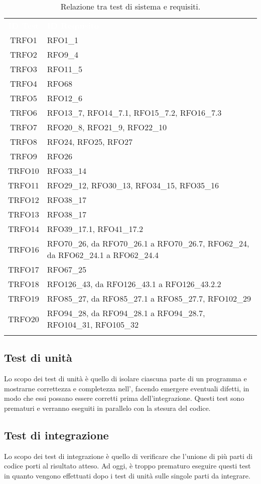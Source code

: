 \begin{longtable}{|c| C{13cm}|}
	\textcolor{white}{\textbf{ID Test}}&
	\textcolor{white}{\textbf{ID Requisito}}\label{tab:TestSistema2}\\
	TRFO1 & RFO1\_1\\ \hline
	TRFO2 & RFO9\_4\\ \hline
	TRFO3 & RFO11\_5\\ \hline
	TRFO4 & RFO68\\ \hline
	TRFO5 & RFO12\_6\\\hline
	TRFO6 & RFO13\_7, RFO14\_7.1, RFO15\_7.2, RFO16\_7.3\\ \hline
	TRFO7 & RFO20\_8, RFO21\_9, RFO22\_10\\ \hline
	TRFO8 & RFO24, RFO25, RFO27\\ \hline
	TRFO9 & RFO26\\ \hline
	TRFO10 & RFO33\_14\\ \hline
	TRFO11 & RFO29\_12, RFO30\_13, RFO34\_15, RFO35\_16\\ \hline
	TRFO12 & RFO38\_17\\ \hline
	TRFO13 & RFO38\_17\\ \hline
	TRFO14 & RFO39\_17.1, RFO41\_17.2\\ \hline
	TRFO16 & RFO70\_26, da RFO70\_26.1 a RFO70\_26.7, RFO62\_24, da RFO62\_24.1 a RFO62\_24.4   \\ \hline
	TRFO17 & RFO67\_25\\ \hline
	TRFO18 & RFO126\_43, da RFO126\_43.1 a RFO126\_43.2.2\\ \hline
	TRFO19 & RFO85\_27, da RFO85\_27.1 a RFO85\_27.7, RFO102\_29\\ \hline
	TRFO20 & RFO94\_28, da RFO94\_28.1 a RFO94\_28.7, RFO104\_31, RFO105\_32\\ \hline
	\caption{Relazione tra test di sistema e requisiti.}\\
\end{longtable}
\newpage
\subsection{Test di unità}
Lo scopo dei test di unità è quello di isolare ciascuna parte di un programma e mostrarne correttezza e completezza nell', facendo emergere eventuali difetti, in modo che essi possano essere corretti prima dell'integrazione. Questi test sono prematuri e verranno eseguiti in parallelo con la stesura del codice.
\subsection{Test di integrazione}
Lo scopo dei test di integrazione è quello di verificare che l'unione di più parti di codice porti al risultato atteso. Ad oggi, è troppo prematuro eseguire questi test in quanto vengono effettuati dopo i test di unità sulle singole parti da integrare.
